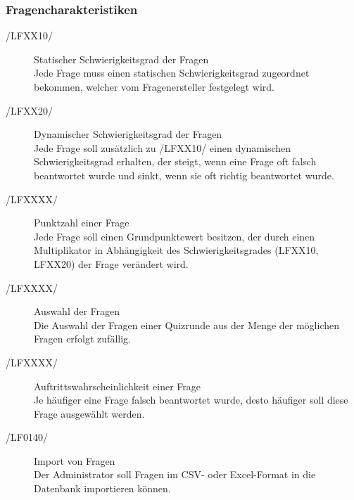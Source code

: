 \documentclass[11pt,a4paper]{scrreprt}
\begin{document}
\subsubsection{Fragencharakteristiken}
\begin{description}
\item[/LFXX10/] Statischer Schwierigkeitsgrad der Fragen \\
Jede Frage muss einen statischen Schwierigkeitsgrad zugeordnet bekommen, welcher vom Fragenersteller festgelegt wird.

\item[/LFXX20/] Dynamischer Schwierigkeitsgrad der Fragen \\
Jede Frage soll zusätzlich zu /LFXX10/ einen dynamischen Schwierigkeitsgrad erhalten, der steigt, wenn eine Frage oft falsch beantwortet wurde und sinkt, wenn sie oft richtig beantwortet wurde.

\item[/LFXXXX/] Punktzahl einer Frage \\
Jede Frage soll einen Grundpunktewert besitzen, der durch einen Multiplikator in Abhängigkeit des Schwierigkeitsgrades (LFXX10, LFXX20) der Frage verändert wird.

\item[/LFXXXX/] Auswahl der Fragen \\
Die Auswahl der Fragen einer Quizrunde aus der Menge der möglichen Fragen erfolgt zufällig.

\item[/LFXXXX/] Auftrittswahrscheinlichkeit einer Frage \\
Je häufiger eine Frage falsch beantwortet wurde, desto häufiger soll diese Frage ausgewählt werden.

\item[/LF0140/] Import von Fragen \\
Der Administrator soll Fragen im CSV- oder Excel-Format in die Datenbank importieren können.
\end{description}
\end{document}
